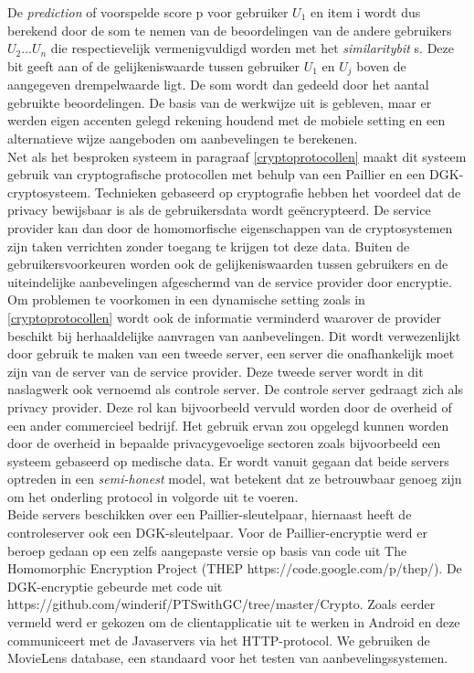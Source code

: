 De \emph{prediction} of voorspelde score p voor gebruiker $U_1$ en item i wordt dus berekend door de som te nemen van de beoordelingen van de andere gebruikers $U_2 ... U_n$ die respectievelijk vermenigvuldigd worden met het \emph{similaritybit} s. Deze bit geeft aan of de gelijkeniswaarde tussen gebruiker $U_1$ en $U_j$ boven de aangegeven drempelwaarde ligt. De som wordt dan gedeeld door het aantal gebruikte beoordelingen. De basis van de werkwijze uit \cite{ZErkinDyn} is gebleven, maar er werden eigen accenten gelegd rekening houdend met de mobiele setting en een alternatieve wijze aangeboden om aanbevelingen te berekenen. \\Net als het besproken systeem in paragraaf \ref{cryptoprotocollen} maakt dit systeem gebruik van cryptografische protocollen met behulp van een Paillier en een DGK-cryptosysteem. Technieken gebaseerd op cryptografie hebben het voordeel dat de privacy bewijsbaar is als de gebruikersdata wordt ge\"encrypteerd. De service provider kan dan door de homomorfische eigenschappen van de cryptosystemen zijn taken verrichten zonder toegang te krijgen tot deze data. Buiten de gebruikersvoorkeuren worden ook de gelijkeniswaarden tussen gebruikers en de uiteindelijke aanbevelingen afgeschermd van de service provider door encryptie.\\ Om problemen te voorkomen in een dynamische setting zoals in \ref{cryptoprotocollen} wordt ook de informatie verminderd waarover de provider beschikt bij herhaaldelijke aanvragen van aanbevelingen. Dit wordt verwezenlijkt door gebruik te maken van een tweede server, een server die onafhankelijk moet zijn van de server van de service provider. Deze tweede server wordt in dit naslagwerk ook vernoemd als controle server. De controle server gedraagt zich als privacy provider. Deze rol kan bijvoorbeeld vervuld worden door de overheid of een ander commercieel bedrijf. Het gebruik ervan zou opgelegd kunnen worden door de overheid in bepaalde privacygevoelige sectoren zoals bijvoorbeeld een systeem gebaseerd op medische data. Er wordt vanuit gegaan dat beide servers optreden in een \emph{semi-honest} model, wat betekent dat ze betrouwbaar genoeg zijn om het onderling protocol in volgorde uit te voeren. \\ Beide servers beschikken over een Paillier-sleutelpaar, hiernaast heeft de controleserver ook een DGK-sleutelpaar. Voor de Paillier-encryptie werd er beroep gedaan op een zelfs aangepaste versie op basis van code uit The Homomorphic Encryption Project (THEP https://code.google.com/p/thep/). De DGK-encryptie gebeurde met code uit https://github.com/winderif/PTSwithGC/tree/master/Crypto. Zoals eerder vermeld werd er gekozen om de clientapplicatie uit te werken in Android en deze communiceert met de Javaservers via het HTTP-protocol. We gebruiken de MovieLens database, een standaard voor het testen van aanbevelingssystemen.